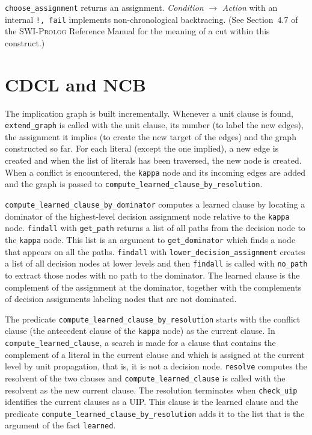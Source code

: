 \documentclass[11pt]{report}
\newcommand*{\p}[1]{\textup{\texttt{#1}}}
\newcommand*{\sw}{\textsc{SWI-Prolog}}
\begin{document}
\p{choose\_assignment} returns an assignment. \emph{Condition}
$\rightarrow$ \emph{Action} with an internal \p{!, fail} implements
non-chronological backtracing. (See Section~4.7 of the \sw{} Reference
Manual for the meaning of a cut within this construct.)


\section{CDCL and NCB}

The implication graph is built incrementally. Whenever a unit clause is
found, \p{extend\_graph} is called with the unit clause, its number (to
label the new edges), the assignment it implies (to create the new
target of the edges) and the graph constructed so far. For each literal
(except the one implied), a new edge is created and when the list of
literals has been traversed, the new node is created. When a conflict is
encountered, the \p{kappa} node and its incoming edges are added and the
graph is passed to \p{compute\_learned\_clause\_by\_resolution}.

\p{compute\_learned\_clause\_by\_dominator} computes a learned clause by
locating a dominator of the highest-level decision assignment node
relative to the \p{kappa} node. \p{findall} with \p{get\_path} returns a
list of all paths from the decision node to the \p{kappa} node. This
list is an argument to \p{get\_dominator} which finds a node that
appears on all the paths. \p{findall} with
\p{lower\_decision\_assignment} creates a list of all decision nodes at
lower levels and then \p{findall} is called with \p{no\_path} to extract
those nodes with no path to the dominator. The learned clause is the
complement of the assignment at the dominator, together with the
complements of decision assignments labeling nodes that are not
dominated.

The predicate \p{compute\_learned\_clause\_by\_resolution} starts with
the conflict clause (the antecedent clause of the \p{kappa} node) as the
current clause. In \p{compute\_learned\_clause}, a search is made for a
clause that contains the complement of a literal in the current clause
and which is assigned at the current level by unit propagation, that is,
it is not a decision node. \p{resolve} computes the resolvent of the two
clauses and \p{compute\_learned\_clause} is called with the resolvent as
the new current clause. The resolution terminates when \p{check\_uip}
identifies the current clauses as a UIP. This clause is the learned
clause and the predicate \p{compute\_learned\_clause\_by\_resolution}
adds it to the list that is the argument of the fact \p{learned}.
\end{document}
